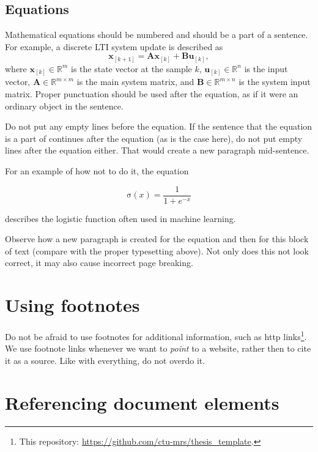\subsection{Equations}
Mathematical equations should be numbered and should be a part of a sentence.
For example, a discrete LTI system update is described as
\begin{equation}
  \mathbf{x}_{\left[k+1\right]} = \mathbf{A}\mathbf{x}_{\left[k\right]} + \mathbf{B}\mathbf{u}_{\left[k\right]},
  \label{eq:lti_system}
\end{equation}
where $\mathbf{x}_{\left[k\right]} \in \mathbb{R}^m$ is the state vector at the sample $k$, $\mathbf{u}_{\left[k\right]} \in \mathbb{R}^n$ is the input vector, $\mathbf{A} \in \mathbb{R}^{m \times m}$ is the main system matrix, and $\mathbf{B} \in \mathbb{R}^{m \times n}$ is the system input matrix.
Proper punctuation should be used after the equation, as if it were an ordinary object in the sentence.

Do not put any empty lines before the equation.
If the sentence that the equation is a part of continues after the equation (as is the case here), do not put empty lines after the equation either.
That would create a new paragraph mid-sentence.
{\color{red}
For an example of how not to do it, the equation

\begin{equation}
  \mathrm{\sigma}(x) = \frac{1}{1 + e^{-x}}
\end{equation}

describes the logistic function often used in machine learning.
}
Observe how a new paragraph is created for the equation and then for this block of text (compare with the proper typesetting above).
Not only does this not look correct, it may also cause incorrect page breaking.

\section{Using footnotes}

Do not be afraid to use footnotes for additional information, such as http links\footnote{This repository: \url{https://github.com/ctu-mrs/thesis_template}.}.
We use footnote links whenever we want to \emph{point} to a website, rather then to cite it as a source.
Like with everything, do not overdo it.

\section{Referencing document elements}

